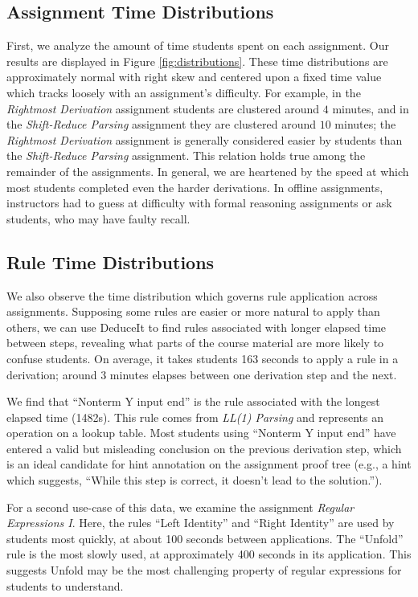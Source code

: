\documentclass{sigchi}
\begin{document}
\subsection{Assignment Time Distributions}

First, we analyze the amount of time students spent on each assignment. Our results are displayed in Figure \ref{fig:distributions}. These time distributions are approximately normal with right skew and centered upon a fixed time value which tracks loosely with an assignment's difficulty. For example, in the \textit{Rightmost Derivation} assignment students are clustered around $4$ minutes, and in the \textit{Shift-Reduce Parsing} assignment they are clustered around $10$ minutes; the \textit{Rightmost Derivation} assignment is generally considered easier by students than the \textit{Shift-Reduce Parsing} assignment. This relation holds true among the remainder of the assignments. In general, we are heartened by the speed at which most students completed even the harder derivations. In offline assignments, instructors had to guess at difficulty with formal reasoning assignments or ask students, who may have faulty recall. %

\subsection{Rule Time Distributions}

We also observe the time distribution which governs rule application across assignments. Supposing some rules are easier or more natural to apply than others, we can use DeduceIt to find rules associated with longer elapsed time between steps, revealing what parts of the course material are more likely to confuse students. On average, it takes students 163 seconds to apply a rule in a derivation; around 3 minutes elapses between one derivation step and the next. 

We find that ``Nonterm Y input end'' is the rule associated with the longest elapsed time (1482s). This rule comes from \textit{LL(1) Parsing} and represents an operation on a lookup table. Most students using ``Nonterm Y input end'' have entered a valid but misleading conclusion on the previous derivation step, which is an ideal candidate for hint annotation on the assignment proof tree (e.g., a hint which suggests, ``While this step is correct, it doesn't lead to the solution.''). %

For a second use-case of this data, we examine the assignment \textit{Regular Expressions I}. Here, the rules ``Left Identity'' and ``Right Identity'' are used by students most quickly, at about 100 seconds between applications. The ``Unfold'' rule is the most slowly used, at approximately 400 seconds in its application. This suggests Unfold may be the most challenging property of regular expressions for students to understand. 
\end{document}
